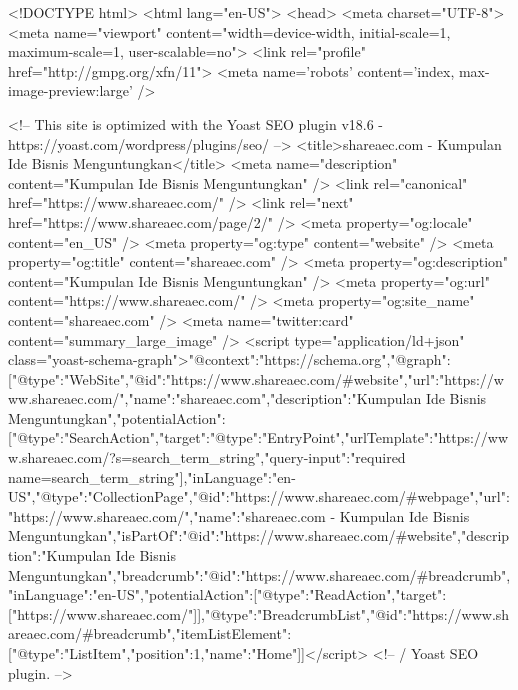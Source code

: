 <!DOCTYPE html>
<html lang="en-US">
<head>
	<meta charset="UTF-8">
	<meta name="viewport" content="width=device-width, initial-scale=1, maximum-scale=1, user-scalable=no">
	<link rel="profile" href="http://gmpg.org/xfn/11">
	<meta name='robots' content='index, max-image-preview:large' />

	<!-- This site is optimized with the Yoast SEO plugin v18.6 - https://yoast.com/wordpress/plugins/seo/ -->
	<title>shareaec.com - Kumpulan Ide Bisnis Menguntungkan</title>
	<meta name="description" content="Kumpulan Ide Bisnis Menguntungkan" />
	<link rel="canonical" href="https://www.shareaec.com/" />
	<link rel="next" href="https://www.shareaec.com/page/2/" />
	<meta property="og:locale" content="en_US" />
	<meta property="og:type" content="website" />
	<meta property="og:title" content="shareaec.com" />
	<meta property="og:description" content="Kumpulan Ide Bisnis Menguntungkan" />
	<meta property="og:url" content="https://www.shareaec.com/" />
	<meta property="og:site_name" content="shareaec.com" />
	<meta name="twitter:card" content="summary_large_image" />
	<script type="application/ld+json" class="yoast-schema-graph">{"@context":"https://schema.org","@graph":[{"@type":"WebSite","@id":"https://www.shareaec.com/#website","url":"https://www.shareaec.com/","name":"shareaec.com","description":"Kumpulan Ide Bisnis Menguntungkan","potentialAction":[{"@type":"SearchAction","target":{"@type":"EntryPoint","urlTemplate":"https://www.shareaec.com/?s={search_term_string}"},"query-input":"required name=search_term_string"}],"inLanguage":"en-US"},{"@type":"CollectionPage","@id":"https://www.shareaec.com/#webpage","url":"https://www.shareaec.com/","name":"shareaec.com - Kumpulan Ide Bisnis Menguntungkan","isPartOf":{"@id":"https://www.shareaec.com/#website"},"description":"Kumpulan Ide Bisnis Menguntungkan","breadcrumb":{"@id":"https://www.shareaec.com/#breadcrumb"},"inLanguage":"en-US","potentialAction":[{"@type":"ReadAction","target":["https://www.shareaec.com/"]}]},{"@type":"BreadcrumbList","@id":"https://www.shareaec.com/#breadcrumb","itemListElement":[{"@type":"ListItem","position":1,"name":"Home"}]}]}</script>
	<!-- / Yoast SEO plugin. -->


